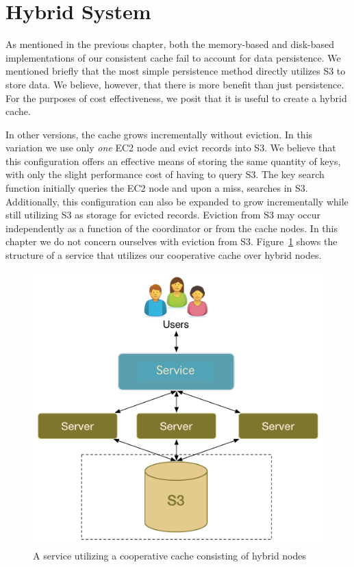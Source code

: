 \section{Hybrid System} %
\label{sec:hybrid_system}
As mentioned in the previous chapter, both the memory-based and disk-based
implementations of our consistent cache fail to account for data persistence.
We mentioned briefly that the most simple persistence method directly utilizes
S3 to store data. We believe, however, that there is more benefit than just
persistence. For the purposes of cost effectiveness, we posit that it is useful
to create a hybrid cache.

In other versions, the cache grows incrementally without eviction. In this
variation we use only \emph{one} EC2 node and evict records into S3. We believe
that this configuration offers an effective means of storing the same quantity
of keys, with only the slight performance cost of having to query S3.  The key
search function initially queries the EC2 node and upon a miss, searches in S3.
Additionally, this configuration can also be expanded to grow incrementally
while still utilizing S3 as storage for evicted records. Eviction from S3 may
occur independently as a function of the coordinator or from the cache nodes.
In this chapter we do not concern ourselves with eviction from S3.
Figure~\ref{fig:hybrid_setup} shows the structure of a service that utilizes
our cooperative cache over hybrid nodes.

\begin{figure}
\begin{center}
\includegraphics[scale=0.5]{figures/auspice_setup.pdf}
\end{center}
\caption{A service utilizing a cooperative cache consisting of hybrid nodes}
\label{fig:hybrid_setup}
\end{figure}


